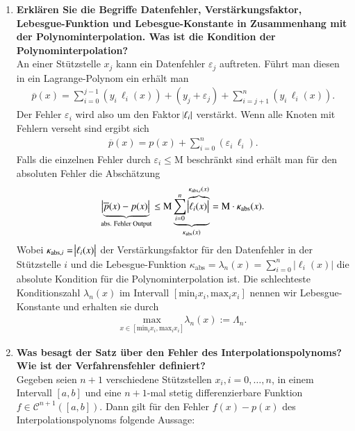 \begin{enumerate}
		\item \textbf{Erklären Sie die Begriffe Datenfehler, Verstärkungsfaktor, Lebesgue-Funktion und Lebesgue-Konstante in Zusammenhang mit der Polynominterpolation. Was ist die Kondition der Polynominterpolation?} \\
			An einer Stützstelle \(x_j\) kann ein Datenfehler \(\varepsilon_j\) auftreten.
			Führt man diesen in ein Lagrange-Polynom ein erhält man
			\begin{align*}
				\overline{p}(x)=\sum_{i=0}^{j-1}\left( y_i\,\ell_i(x)\right) + (y_j+\varepsilon_j)+\sum_{i=j+1}^{n}\left( y_i\,\ell_i(x)\right).
			\end{align*}
			Der Fehler \(\varepsilon_i\) wird also um den Faktor  \(\abs{\ell_i}\) verstärkt.
			Wenn alle Knoten mit Fehlern verseht sind ergibt sich
			\begin{align*}
				\overline{p}(x)=p(x)+\sum_{i=0}^{n}\left( \varepsilon_i\,\ell_i \right) .
			\end{align*}
			Falls die einzelnen Fehler durch \(\varepsilon_i\le\text{M}\) beschränkt sind erhält man für den absoluten Fehler die Abschätzung
			\begin{align*}
				\underbrace{\abs{\overline{p}(x)-p(x)}}_\text{abs. Fehler Output}\leq \text{M}\underbrace{\sum_{i=0}^{n}\overbrace{\abs{\ell_i(x)}}^{\kappa_{\text{abs},i}(x)}}_{\kappa_\text{abs}(x)}
				= \text{M}\cdot\kappa_\text{abs}(x).
			\end{align*}
			Wobei \(\kappa_{\text{abs},i}=\abs{\ell_i(x)}\) der Verstärkungsfaktor für den Datenfehler in der Stützstelle \(i\) und die Lebesgue-Funktion \(\kappa_\text{abs}=\lambda_n(x)=\sum_{i=0}^{n}|\ell_i(x)|\) die absolute Kondition für die Polynominterpolation ist. Die schlechteste Konditionszahl \(\lambda_n(x)\) im Intervall \([\text{min}_ix_i,\text{max}_ix_i]\) nennen wir Lebesgue-Konstante und erhalten sie durch
			\begin{align*}
				\underset{x\in[\text{min}_ix_i,\text{max}_ix_i]}{\text{max}} \lambda_n(x):=\Lambda_n.
			\end{align*}
		\item \textbf{Was besagt der Satz über den Fehler des Interpolationspolynoms? Wie ist der Verfahrensfehler definiert?} \\
			Gegeben seien \(n+1\) verschiedene Stützstellen \(x_i, i=0,\dots,n\), in einem Intervall \([a,b]\) und eine \(n+1\)-mal stetig differenzierbare Funktion \(f\in\mathscr{C}^{n+1}([a,b])\). Dann gilt für den Fehler \( f(x)-p(x) \) des Interpolationspolynoms folgende Aussage: \\

\end{enumerate}
